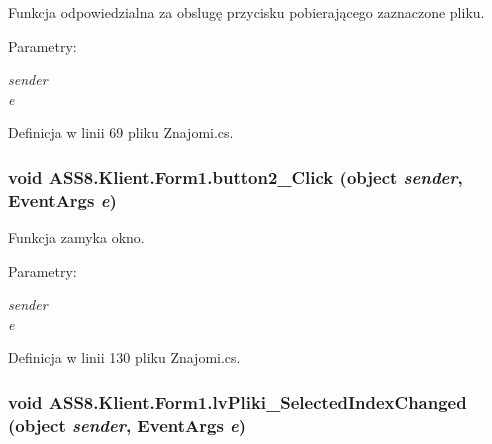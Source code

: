 Funkcja odpowiedzialna za obslugę przycisku pobierającego zaznaczone pliku. 

\begin{Desc}
\item[Parametry:]
\begin{description}
\item[{\em sender}]\item[{\em e}]\end{description}
\end{Desc}


Definicja w linii 69 pliku Znajomi.cs.\hypertarget{a00003_657650d2f810f254f265eb4956810386}{
\subsubsection[{button2\_\-Click}]{\setlength{\rightskip}{0pt plus 5cm}void ASS8.Klient.Form1.button2\_\-Click (object {\em sender}, \/  EventArgs {\em e})}}
\label{d1/d7c/a00003_657650d2f810f254f265eb4956810386}


Funkcja zamyka okno. 

\begin{Desc}
\item[Parametry:]
\begin{description}
\item[{\em sender}]\item[{\em e}]\end{description}
\end{Desc}


Definicja w linii 130 pliku Znajomi.cs.\hypertarget{a00003_8f11bfa541be459982c72ad615898de7}{
\subsubsection[{lvPliki\_\-SelectedIndexChanged}]{\setlength{\rightskip}{0pt plus 5cm}void ASS8.Klient.Form1.lvPliki\_\-SelectedIndexChanged (object {\em sender}, \/  EventArgs {\em e})}}
\label{d1/d7c/a00003_8f11bfa541be459982c72ad615898de7}




